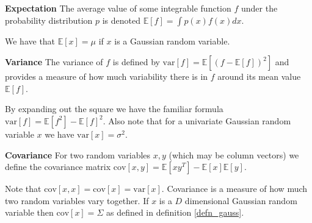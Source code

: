 \begin{defn}
\textbf{Expectation} The average value of some integrable function $f$ under the probability distribution $p$ is denoted $\mathbb{E}[f] = \int p(x)f(x)dx$.
\label{def_expectation}
\end{defn}
We have that $\mathbb{E}[x]=\mu$ if $x$ is a Gaussian random variable.
\begin{defn}
\textbf{Variance} The variance of $f$ is defined by $\text{var}[f] = \mathbb{E}[(f - \mathbb{E}[f])^2]$ and provides a measure of how much variability there is in $f$ around its mean value $\mathbb{E}[f]$.
\label{def_variance}
\end{defn}
By expanding out the square we have the familiar formula $\text{var}[f] = \mathbb{E}[f^2] - \mathbb{E}[f]^2$. Also note that for a  univariate Gaussian random variable $x$ we have $\text{var}[x] =\sigma^2$.
\begin{defn}
\textbf{Covariance} For two random variables $x,y$ (which may be column vectors) we define the covariance matrix $\text{cov}[x,y] = \mathbb{E}[xy^T] - \mathbb{E}[x]\mathbb{E}[y]$.
\label{def_covariance}
\end{defn}
Note that $\text{cov}[x,x]=\text{cov}[x]=\text{var}[x]$. Covariance is a measure of how much two random variables vary together. If $x$ is a $D$ dimensional Gaussian random variable then $\text{cov}[x] = \Sigma$ as defined in definition \ref{defn_gauss}.

